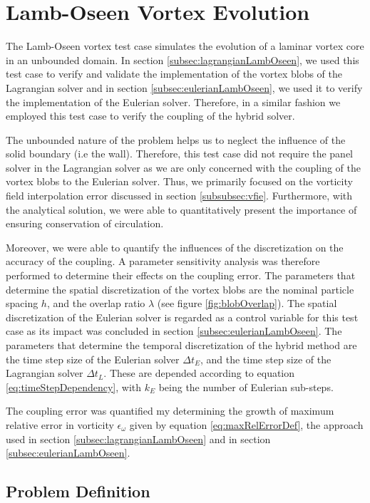 \section{Lamb-Oseen Vortex Evolution}
\label{sec:vvhm-love}
The Lamb-Oseen vortex test case simulates the evolution of a laminar vortex core in an unbounded domain. In section \ref{subsec:lagrangianLambOseen}, we used this test case to verify and validate the implementation of the vortex blobs of the Lagrangian solver and in section \ref{subsec:eulerianLambOseen}, we used it to verify the implementation of the Eulerian solver. Therefore, in a similar fashion we employed this test case to verify the coupling of the hybrid solver. 

The unbounded nature of the problem helps us to neglect the influence of the solid boundary (i.e the wall). Therefore, this test case did not require the panel solver in the Lagrangian solver as we are only concerned with the coupling of the vortex blobs to the Eulerian solver. Thus, we primarily focused on the vorticity field interpolation error discussed in section \ref{subsubsec:vfie}. Furthermore, with the analytical solution, we were able to quantitatively present the importance of ensuring conservation of circulation.

Moreover, we were able to quantify the influences of the discretization on the accuracy of the coupling. A parameter sensitivity analysis was therefore performed to determine their effects on the coupling error. The parameters that determine the spatial discretization of the vortex blobs are the nominal particle spacing $h$, and the overlap ratio $\lambda$ (see figure \ref{fig:blobOverlap}). The spatial discretization of the Eulerian solver is regarded as a control variable for this test case as its impact was concluded in section \ref{subsec:eulerianLambOseen}. The parameters that determine the temporal discretization of the hybrid method are the time step size of the Eulerian solver $\Delta t_E$, and the time step size of the Lagrangian solver $\Delta t_L$. These are depended according to equation \ref{eq:timeStepDependency}, with $k_E$ being the number of Eulerian sub-steps.

The coupling error was quantified my determining the growth of maximum relative error in vorticity $\epsilon_{\omega}$ given by equation \ref{eq:maxRelErrorDef}, the approach used in section \ref{subsec:lagrangianLambOseen} and in section \ref{subsec:eulerianLambOseen}. 


\subsection{Problem Definition}

